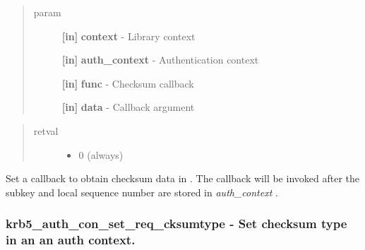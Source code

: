 \documentclass[letterpaper,10pt,english]{sphinxmanual}
\begin{document}
\begin{fulllineitems}
\label{appdev/refs/api/krb5_auth_con_set_checksum_func:c.krb5_auth_con_set_checksum_func}
\end{fulllineitems}

\begin{quote}\begin{description}
\item[{param}] \leavevmode
\textbf{{[}in{]}} \textbf{context} - Library context

\textbf{{[}in{]}} \textbf{auth\_context} - Authentication context

\textbf{{[}in{]}} \textbf{func} - Checksum callback

\textbf{{[}in{]}} \textbf{data} - Callback argument

\end{description}\end{quote}
\begin{quote}\begin{description}
\item[{retval}] \leavevmode\begin{itemize}
\item {} 
0   (always)

\end{itemize}

\end{description}\end{quote}

Set a callback to obtain checksum data in {\hyperref[appdev/refs/api/krb5_mk_req:c.krb5_mk_req]{}} . The callback will be invoked after the subkey and local sequence number are stored in \emph{auth\_context} .


\subsubsection{krb5\_auth\_con\_set\_req\_cksumtype -  Set checksum type in an an auth context.}
\label{appdev/refs/api/krb5_auth_con_set_req_cksumtype:krb5-auth-con-set-req-cksumtype-set-checksum-type-in-an-an-auth-context}\label{appdev/refs/api/krb5_auth_con_set_req_cksumtype::doc}
\end{document}
